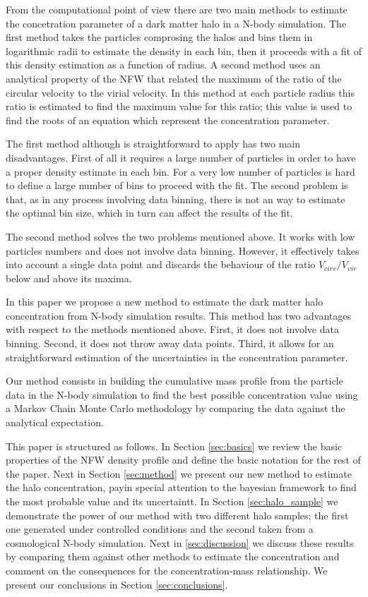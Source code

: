 \documentclass[useAMS,usenatbib]{mn2e}
\begin{document}
From the computational point of view there are two main methods to
estimate the concetration parameter of a dark matter halo in a N-body
simulation. The first method takes the particles comprosing the halos
and bins them in logarithmic radii to estimate the density in each
bin, then it proceeds with a fit of this density estimation as a
function of radius. A second method uses an analytical property of the
NFW that related the maximum of the ratio of the circular velocity to
the virial velocity. In this method at each particle radius this ratio
is estimated to find the maximum value for this ratio; this value is
used to find the roots of an equation which represent the
concentration parameter.

The first method although is straightforward to apply has two main
disadvantages. First of all it requires a large number of particles in
order to have a proper density estimate in each bin. For a very low
number of particles is hard to define a large number of bins to
proceed with the fit. The second problem is that, as in any process
involving data binning, there is not an way to estimate the optimal
bin size, which in turn can affect the results of the fit.

The second method solves the two problems mentioned above. It works
with low particles numbers and does not involve data binning. However,
it effectively takes into account a single data point and discards the
behaviour of the ratio $V_{cirv}/V_{vir}$ below and above its
maxima.

In this paper we propose a new method to estimate the dark matter halo
concentration from N-body simulation results. This method has two
advantages with respect to the methods mentioned above. First, it does
not involve data binning. Second, it does not throw away data
points. Third, it allows for an straightforward estimation of the
uncertainties in the concentration parameter.

Our method consists in building the cumulative mass profile from the
particle data in the N-body simulation to find the best possible
concentration value using a Markov Chain Monte Carlo methodology by
comparing the data against the analytical expectation.

This paper is structured as follows. In Section \ref{sec:basics} we
review the basic properties of the NFW density profile and define the
basic notation for the rest of the paper. Next in Section
\ref{sec:method} we present our new method to estimate the halo
concentration, payin special attention to the bayesian framework to
find the most probable value and its uncertaintt. In Section
\ref{sec:halo_sample} we demonstrate the power of our method with two
different halo samples; the first one generated under controlled
conditions and the second taken from a cosmological N-body
simulation. Next in \ref{sec:discussion} we discuss these results by
comparing them against other methods to estimate the concentration and
comment on the consequences for the concentration-mass
relationship. We present our conclusions in Section \ref{sec:conclusions}.
\end{document}
